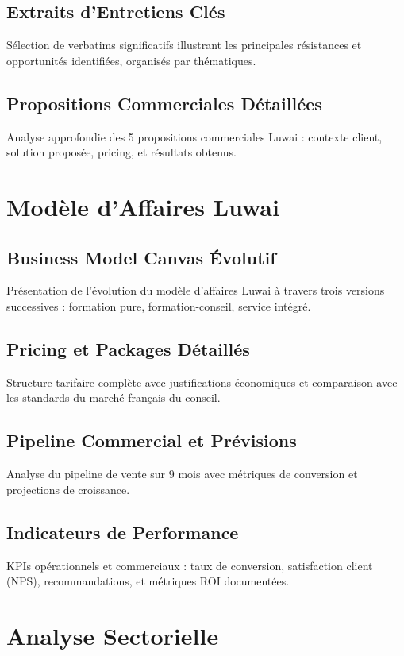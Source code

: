 \documentclass[12pt,a4paper]{report}
\begin{document}
\section{Extraits d'Entretiens Clés}
Sélection de verbatims significatifs illustrant les principales résistances et opportunités identifiées, organisés par thématiques.

\section{Propositions Commerciales Détaillées}
Analyse approfondie des 5 propositions commerciales Luwai : contexte client, solution proposée, pricing, et résultats obtenus.

\chapter{Modèle d'Affaires Luwai}
\label{app:luwai}

\section{Business Model Canvas Évolutif}
Présentation de l'évolution du modèle d'affaires Luwai à travers trois versions successives : formation pure, formation-conseil, service intégré.

\section{Pricing et Packages Détaillés}
Structure tarifaire complète avec justifications économiques et comparaison avec les standards du marché français du conseil.

\section{Pipeline Commercial et Prévisions}
Analyse du pipeline de vente sur 9 mois avec métriques de conversion et projections de croissance.

\section{Indicateurs de Performance}
KPIs opérationnels et commerciaux : taux de conversion, satisfaction client (NPS), recommandations, et métriques ROI documentées.

\chapter{Analyse Sectorielle}
\label{app:analyse}
\end{document}
